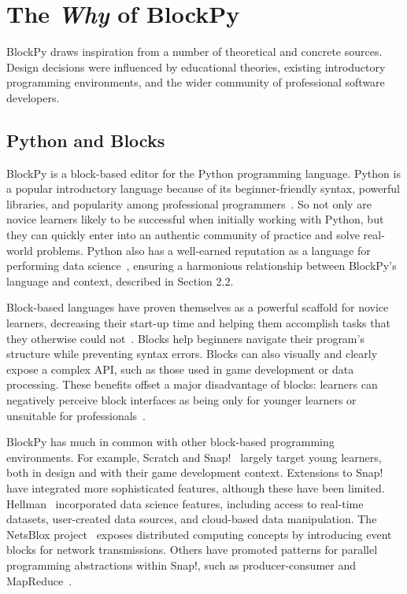 \documentclass[10pt,journal,compsoc]{IEEEtran}
\begin{document}
\section{The \textit{Why} of BlockPy}

BlockPy draws inspiration from a number of theoretical and concrete sources.
Design decisions were influenced by educational theories, existing introductory programming environments, and the wider community of professional software developers.

\subsection{Python and Blocks}

BlockPy is a block-based editor for the Python programming language.
Python is a popular introductory language because of its beginner-friendly syntax, powerful libraries, and popularity among professional programmers~\cite{guo2014python}.
So not only are novice learners likely to be successful when initially working with Python, but they can quickly enter into an authentic community of practice and solve real-world problems.
Python also has a well-earned reputation as a language for performing data science~\cite{schutt2013doing}, ensuring a harmonious relationship between BlockPy's language and context, described in Section 2.2.

Block-based languages have proven themselves as a powerful scaffold for novice learners, decreasing their start-up time and helping them accomplish tasks that they otherwise could not~\cite{bbl-Price,WeintropIcer}.
Blocks help beginners navigate their program's structure while preventing syntax errors.
Blocks can also visually and clearly expose a complex API, such as those used in game development or data processing.
These benefits offset a major disadvantage of blocks: learners can negatively perceive block interfaces as being only for younger learners or unsuitable for professionals~\cite{weintrop2015block}.

BlockPy has much in common with other block-based programming environments. For example, Scratch and Snap!~\cite{resnick2009scratch} largely target young learners, both in design and with their game development context.
Extensions to Snap! have integrated more sophisticated features, although these have been limited.
Hellman~\cite{hellmann2015datasnap} incorporated data science features, including access to real-time datasets, user-created data sources, and cloud-based data manipulation.
The NetsBlox project~\cite{broll2016netsblox} exposes distributed computing concepts by introducing event blocks for network transmissions.
Others have promoted patterns for parallel programming abstractions within Snap!, such as producer-consumer and MapReduce~\cite{feng2015block}.
\end{document}
